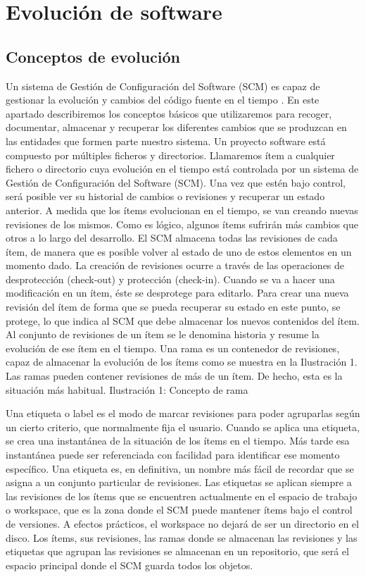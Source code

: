 \section{Evolución de software}
\subsection{Conceptos de evolución}
Un sistema de Gestión de Configuración del Software (SCM) es capaz de gestionar la evolución y cambios del código fuente en el tiempo \cite{berczuk_software_2002, sommerville_software_2016}.
En este apartado describiremos los conceptos básicos que utilizaremos para recoger, documentar, almacenar y recuperar los diferentes cambios que se produzcan en las entidades que formen parte nuestro sistema.
Un proyecto software está compuesto por múltiples ficheros y directorios. Llamaremos ítem a cualquier fichero o directorio cuya evolución en el tiempo está controlada por un sistema de Gestión de Configuración del Software (SCM). Una vez que estén bajo control, será posible ver su historial de cambios o revisiones y recuperar un estado anterior.
A medida que los ítems evolucionan en el tiempo, se van creando nuevas revisiones de los mismos. Como es lógico, algunos ítems sufrirán más cambios que otros a lo largo del desarrollo. El SCM almacena todas las revisiones de cada ítem, de manera que es posible volver al estado de uno de estos elementos en un momento dado.
La creación de revisiones ocurre a través de las operaciones de desprotección (check-out) y protección (check-in). Cuando se va a hacer una modificación en un ítem, éste se desprotege para editarlo. Para crear una nueva revisión del ítem de forma que se pueda recuperar su estado en este punto, se protege, lo que indica al SCM que debe almacenar los nuevos contenidos del ítem.
Al conjunto de revisiones de un ítem se le denomina historia y resume la evolución de ese ítem en el tiempo.
Una rama es un contenedor de revisiones, capaz de almacenar la evolución de los ítems como se muestra en la Ilustración 1. Las ramas pueden contener revisiones de más de un ítem. De hecho, esta es la situación más habitual.
Ilustración 1: Concepto de rama

Una etiqueta o label es el modo de marcar revisiones para poder agruparlas según un cierto criterio, que normalmente fija el usuario. Cuando se aplica una etiqueta, se crea una instantánea de la situación de los ítems en el tiempo. Más tarde esa instantánea puede ser referenciada con facilidad para identificar ese momento específico. Una etiqueta es, en definitiva, un nombre más fácil de recordar que se asigna a un conjunto particular de revisiones.
Las etiquetas se aplican siempre a las revisiones de los ítems que se encuentren actualmente en el espacio de trabajo o workspace, que es la zona donde el SCM puede mantener ítems bajo el control de versiones. A efectos prácticos, el workspace no dejará de ser un directorio en el disco.
Los ítems, sus revisiones, las ramas donde se almacenan las revisiones y las etiquetas que agrupan las revisiones se almacenan en un repositorio, que será el espacio principal donde el SCM guarda todos los objetos.


